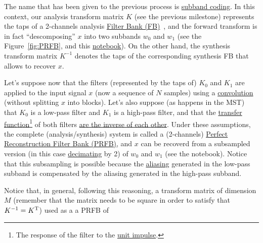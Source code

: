 The name that has been given to the previous process is
\href{https://en.wikipedia.org/wiki/Sub-band_coding}{subband
  coding}. In this context, our analysis transform matrix $K$ (see the
previous milestone) represents the taps of a 2-channels analysis
\href{https://en.wikipedia.org/wiki/Filter_bank}{Filter Bank
  (FB)}~\cite{vetterli1995wavelets}, and the forward transform is in
fact ``descomposing'' $x$ into two subbands $w_0$ and $w_1$ (see the
Figure~\ref{fig:PRFB}, and this \href{}{notebook}). On the other hand,
the synthesis transform matrix $K^{-1}$ denotes the taps of the
corresponding synthesis FB that allows to recover $x$.

Let's suppose now that the filters (represented by the taps of) $K_0$
and $K_1$ are applied to the input signal $x$ (now a sequence of $N$
samples) using a
\href{https://en.wikipedia.org/wiki/Kernel_(image_processing)}{convolution}
(without splitting $x$ into blocks). Let's also suppose (as happens in
the MST) that $K_0$ is a low-pass filter and $K_1$ is a high-pass
filter, and that the
\href{https://en.wikipedia.org/wiki/Filter_(signal_processing)#The_transfer_function}{transfer
  function}\footnote{The response of the filter to the
  \href{https://en.wikipedia.org/?title=Unit_impulse&redirect=no}{unit
    impulse}.} of both filters
\href{https://en.wikipedia.org/wiki/Filter_bank#Perfect_reconstruction_filter_banks}{are
  the inverse of each other}. Under these assumptions, the complete
(analysis/synthesis) system is called a (2-channels)
\href{https://en.wikipedia.org/wiki/Filter_bank#Perfect_reconstruction_filter_banks}{Perfect
  Reconstruction Filter Bank (PRFB)}, and $x$ can be recoverd from a
subsampled version (in this case
\href{https://en.wikipedia.org/wiki/Downsampling_(signal_processing)}{decimating}
by 2) of $w_0$ and $w_1$ (see the notebook). Notice that this
subsampling is possible because the
\href{https://en.wikipedia.org/wiki/Aliasing}{aliasing} generated in
the low-pass subband is compensated by the aliasing generated in the
high-pass subband.

 Notice that, in
general, following this reasoning, a transform matrix of dimension $M$
(remember that the matrix needs to be square in order to satisfy that
$K^{-1}=K^{\text T}$) used as a a PRFB of

